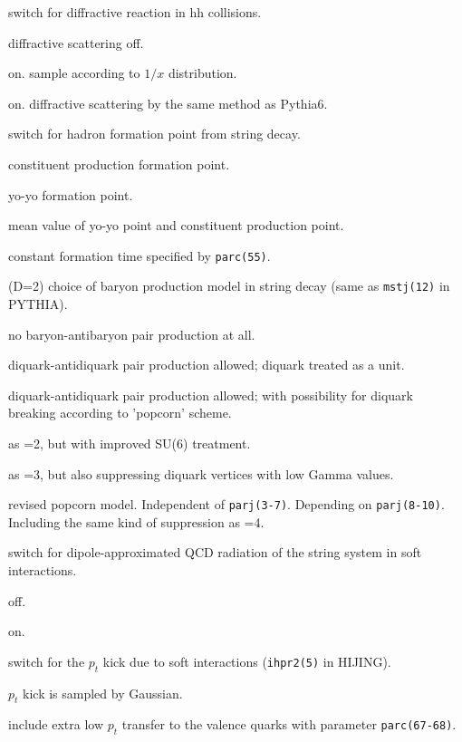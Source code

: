 \documentclass[]{article}
\newenvironment{entry}%
{\begin{list}{}{\setlength{\topsep}{0mm} \setlength{\itemsep}{0mm}
\setlength{\parskip}{0mm} \setlength{\parsep}{0mm}
\setlength{\leftmargin}{20mm} \setlength{\rightmargin}{0mm}
\setlength{\labelwidth}{18mm} \setlength{\labelsep}{2mm}}}%
{\end{list}}
\newenvironment{subentry}%
{\begin{list}{}{\setlength{\topsep}{0mm} \setlength{\itemsep}{0mm}
\setlength{\parskip}{0mm} \setlength{\parsep}{0mm}
\setlength{\leftmargin}{10mm} \setlength{\rightmargin}{0mm}
\setlength{\labelwidth}{18mm} \setlength{\labelsep}{2mm}}}%
{\end{list}}
\newcommand{\ttt}[1]{{\tt#1}}
\newcommand{\itemt}[1]{\item[{\tt #1}\hfill]}
\begin{document}
\begin{entry}
\itemt{mstc(71)(D=2) :} switch for diffractive reaction in hh collisions.
 \begin{subentry}
    \itemt{$=0$ :} diffractive scattering off.
    \itemt{$=1$ :} on. sample according to $1/x$ distribution.
    \itemt{$=2$ :} on. diffractive scattering by the same method as Pythia6.
 \end{subentry}

\itemt{mstc(72)(D=2) :} switch for hadron formation point from string decay.
 \begin{subentry}
    \itemt{$=1$:} constituent production formation point.
    \itemt{$=2$:} yo-yo formation point.
    \itemt{$=3$:} mean value of yo-yo point and constituent production point.
    \itemt{$=4$:} constant formation time specified by \ttt{parc(55)}.
 \end{subentry}

\itemt{mstc(73):}(D=2) choice of baryon production model in string decay
    (same as \ttt{mstj(12)} in PYTHIA).
 \begin{subentry}
   \itemt{$=0$ :} no baryon-antibaryon pair production at all.
   \itemt{$=1$ :} diquark-antidiquark pair production allowed; diquark
                  treated as a unit.
   \itemt{$=2$ :} diquark-antidiquark pair production allowed;
           with possibility for diquark breaking according to 'popcorn' scheme.
   \itemt{$=3$ :} as =2, but with improved SU(6) treatment.
   \itemt{$=4$ :} as =3, but also suppressing diquark vertices with low Gamma
                  values.
   \itemt{$=5$ :} revised popcorn model. Independent of \ttt{parj(3-7)}.
                  Depending on \ttt{parj(8-10)}. Including the same kind of
                 suppression as =4.
 \end{subentry}

\itemt{mstc(74)(D=1) :} switch for dipole-approximated QCD radiation
                    of the string system in soft interactions.

 \begin{subentry}
   \itemt{$=0$ :} off.
   \itemt{$=1$ :} on.
 \end{subentry}

\itemt{mstc(75)(D=1) :} switch for the $p_t$ kick due to soft interactions
                 (\ttt{ihpr2(5)} in HIJING).
 \begin{subentry}
   \itemt{$=0$ :} $p_t$ kick is sampled by Gaussian.
   \itemt{$=1$ :} include extra low $p_t$ transfer to the valence quarks
       with parameter \ttt{parc(67-68)}.
 \end{subentry}


\end{entry}
\end{document}
